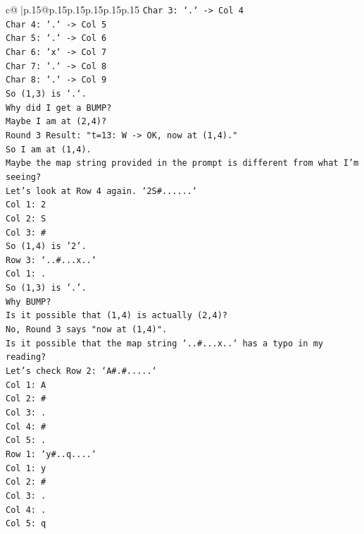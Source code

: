 \documentclass{article}
\begin{document}
{\begin{supertabular}{c@{$\;$}|p{.15\linewidth}@{}p{.15\linewidth}p{.15\linewidth}p{.15\linewidth}p{.15\linewidth}p{.15\linewidth}}
{{{\texttt{Char 3: `.` {-}> Col 4} \\
\texttt{Char 4: `.` {-}> Col 5} \\
\texttt{Char 5: `.` {-}> Col 6} \\
\texttt{Char 6: `x` {-}> Col 7} \\
\texttt{Char 7: `.` {-}> Col 8} \\
\texttt{Char 8: `.` {-}> Col 9} \\
\texttt{So (1,3) is `.`.} \\
\texttt{Why did I get a BUMP?} \\
\texttt{Maybe I am at (2,4)?} \\
\texttt{Round 3 Result: "t=13: W {-}> OK, now at (1,4)."} \\
\texttt{So I am at (1,4).} \\
\texttt{Maybe the map string provided in the prompt is different from what I'm seeing?} \\
\texttt{Let's look at Row 4 again. `2S\#......`} \\
\texttt{Col 1: 2} \\
\texttt{Col 2: S} \\
\texttt{Col 3: \#} \\
\texttt{So (1,4) is '2'.} \\
\texttt{Row 3: `..\#...x..`} \\
\texttt{Col 1: .} \\
\texttt{So (1,3) is '.'.} \\
\texttt{Why BUMP?} \\
\texttt{Is it possible that (1,4) is actually (2,4)?} \\
\texttt{No, Round 3 says "now at (1,4)".} \\
\texttt{Is it possible that the map string `..\#...x..` has a typo in my reading?} \\
\texttt{Let's check Row 2: `A\#.\#.....`} \\
\texttt{Col 1: A} \\
\texttt{Col 2: \#} \\
\texttt{Col 3: .} \\
\texttt{Col 4: \#} \\
\texttt{Col 5: .} \\
\texttt{Row 1: `y\#..q....`} \\
\texttt{Col 1: y} \\
\texttt{Col 2: \#} \\
\texttt{Col 3: .} \\
\texttt{Col 4: .} \\
\texttt{Col 5: q} \\
}}}
\end{supertabular}}
\end{document}
